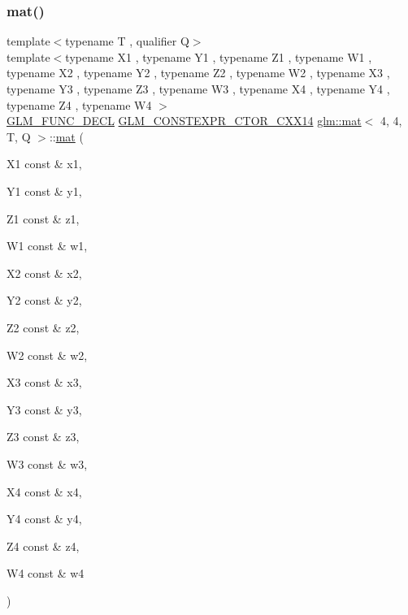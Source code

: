 \subsubsection{\texorpdfstring{mat()}{mat()}\hspace{0.1cm}{\footnotesize\ttfamily [7/21]}}
{\footnotesize\ttfamily template$<$typename T , qualifier Q$>$ \\
template$<$typename X1 , typename Y1 , typename Z1 , typename W1 , typename X2 , typename Y2 , typename Z2 , typename W2 , typename X3 , typename Y3 , typename Z3 , typename W3 , typename X4 , typename Y4 , typename Z4 , typename W4 $>$ \\
\mbox{\hyperlink{setup_8hpp_ab2d052de21a70539923e9bcbf6e83a51}{G\+L\+M\+\_\+\+F\+U\+N\+C\+\_\+\+D\+E\+CL}} \mbox{\hyperlink{setup_8hpp_a0900f9145e68bf6061b6f5e7be3fa751}{G\+L\+M\+\_\+\+C\+O\+N\+S\+T\+E\+X\+P\+R\+\_\+\+C\+T\+O\+R\+\_\+\+C\+X\+X14}} \mbox{\hyperlink{structglm_1_1mat}{glm\+::mat}}$<$ 4, 4, T, Q $>$\+::\mbox{\hyperlink{structglm_1_1mat}{mat}} (\begin{DoxyParamCaption}\item[{X1 const \&}]{x1,  }\item[{Y1 const \&}]{y1,  }\item[{Z1 const \&}]{z1,  }\item[{W1 const \&}]{w1,  }\item[{X2 const \&}]{x2,  }\item[{Y2 const \&}]{y2,  }\item[{Z2 const \&}]{z2,  }\item[{W2 const \&}]{w2,  }\item[{X3 const \&}]{x3,  }\item[{Y3 const \&}]{y3,  }\item[{Z3 const \&}]{z3,  }\item[{W3 const \&}]{w3,  }\item[{X4 const \&}]{x4,  }\item[{Y4 const \&}]{y4,  }\item[{Z4 const \&}]{z4,  }\item[{W4 const \&}]{w4 }\end{DoxyParamCaption})}

\mbox{\label{structglm_1_1mat_3_014_00_014_00_01_t_00_01_q_01_4_a5321c85fc84ae012f0f05976555d00b0}} 
